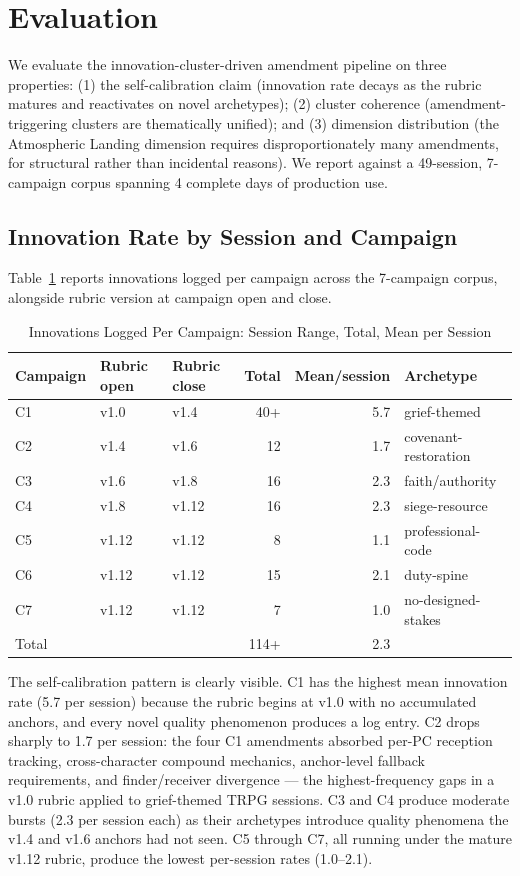 
\section{Evaluation}
\label{sec:evaluation}

We evaluate the innovation-cluster-driven amendment pipeline on three properties:
(1) the self-calibration claim (innovation rate decays as the rubric matures and
reactivates on novel archetypes); (2) cluster coherence (amendment-triggering
clusters are thematically unified); and (3) dimension distribution (the Atmospheric
Landing dimension requires disproportionately many amendments, for structural
rather than incidental reasons). We report against a 49-session, 7-campaign corpus
spanning 4 complete days of production use.

\subsection{Innovation Rate by Session and Campaign}

Table~\ref{tab:innovations} reports innovations logged per campaign across the
7-campaign corpus, alongside rubric version at campaign open and close.

\begin{table}[t]
\caption{Innovations Logged Per Campaign: Session Range, Total, Mean per Session}
\label{tab:innovations}
\begin{tabular}{@{}lllrrl@{}}
\toprule
Campaign & Rubric open & Rubric close & Total & Mean/session & Archetype \\
\midrule
C1 & v1.0 & v1.4 & 40+ & 5.7 & grief-themed \\
C2 & v1.4 & v1.6 & 12  & 1.7 & covenant-restoration \\
C3 & v1.6 & v1.8 & 16  & 2.3 & faith/authority \\
C4 & v1.8 & v1.12 & 16 & 2.3 & siege-resource \\
C5 & v1.12 & v1.12 & 8  & 1.1 & professional-code \\
C6 & v1.12 & v1.12 & 15 & 2.1 & duty-spine \\
C7 & v1.12 & v1.12 & 7  & 1.0 & no-designed-stakes \\
\midrule
Total & & & 114+ & 2.3 & \\
\bottomrule
\end{tabular}
\end{table}

The self-calibration pattern is clearly visible. C1 has the highest mean
innovation rate (5.7 per session) because the rubric begins at v1.0 with no
accumulated anchors, and every novel quality phenomenon produces a log entry.
C2 drops sharply to 1.7 per session: the four C1 amendments absorbed
per-PC reception tracking, cross-character compound mechanics, anchor-level
fallback requirements, and finder/receiver divergence --- the highest-frequency
gaps in a v1.0 rubric applied to grief-themed TRPG sessions. C3 and C4 produce
moderate bursts (2.3 per session each) as their archetypes introduce quality
phenomena the v1.4 and v1.6 anchors had not seen. C5 through C7, all running
under the mature v1.12 rubric, produce the lowest per-session rates (1.0--2.1).

